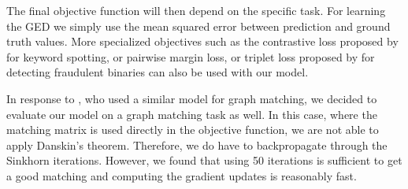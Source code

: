 The final objective function will then depend on the specific task. For learning the GED we simply use the mean squared error between prediction and ground truth values. More specialized objectives such as the contrastive loss proposed by \cite{riba2018} for keyword spotting, or pairwise margin loss, or triplet loss proposed by \cite{li2019} for detecting fraudulent binaries can also be used with our model.

In response to \cite{fey2020_update}, who used a similar model for graph matching, we decided to evaluate our model on a graph matching task as well. In this case, where the matching matrix is used directly in the objective function, we are not able to apply Danskin's theorem. Therefore, we do have to backpropagate through the Sinkhorn iterations. However, we found that using 50 iterations is sufficient to get a good matching and computing the gradient updates is reasonably fast.

